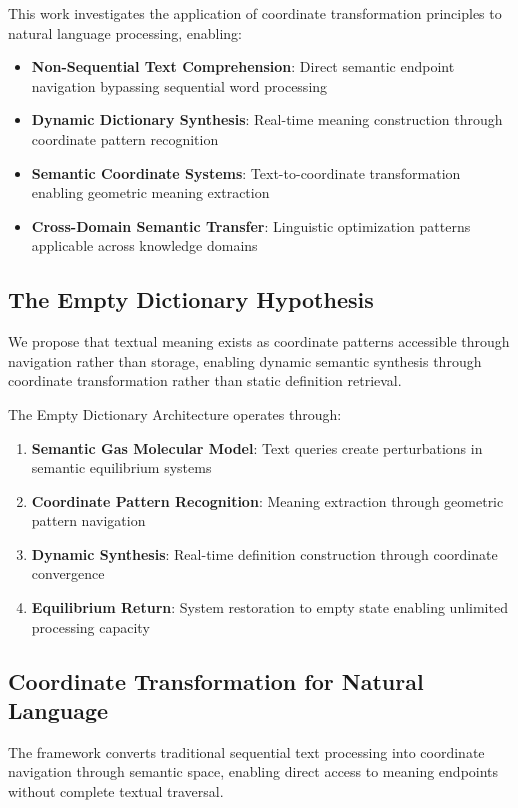 \documentclass[12pt,a4paper]{article}
\begin{document}
This work investigates the application of coordinate transformation principles to natural language processing, enabling:

\begin{itemize}
\item \textbf{Non-Sequential Text Comprehension}: Direct semantic endpoint navigation bypassing sequential word processing
\item \textbf{Dynamic Dictionary Synthesis}: Real-time meaning construction through coordinate pattern recognition
\item \textbf{Semantic Coordinate Systems}: Text-to-coordinate transformation enabling geometric meaning extraction
\item \textbf{Cross-Domain Semantic Transfer}: Linguistic optimization patterns applicable across knowledge domains
\end{itemize}

\subsection{The Empty Dictionary Hypothesis}

We propose that textual meaning exists as coordinate patterns accessible through navigation rather than storage, enabling dynamic semantic synthesis through coordinate transformation rather than static definition retrieval.

The Empty Dictionary Architecture operates through:

\begin{enumerate}
\item \textbf{Semantic Gas Molecular Model}: Text queries create perturbations in semantic equilibrium systems
\item \textbf{Coordinate Pattern Recognition}: Meaning extraction through geometric pattern navigation
\item \textbf{Dynamic Synthesis}: Real-time definition construction through coordinate convergence
\item \textbf{Equilibrium Return}: System restoration to empty state enabling unlimited processing capacity
\end{enumerate}

\subsection{Coordinate Transformation for Natural Language}

The framework converts traditional sequential text processing into coordinate navigation through semantic space, enabling direct access to meaning endpoints without complete textual traversal.
\end{document}
